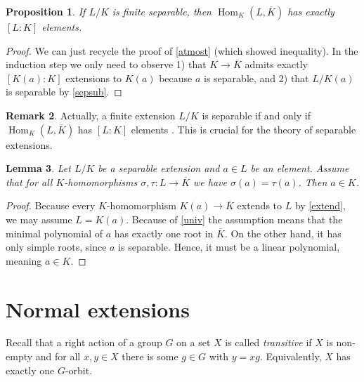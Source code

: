 \documentclass[11pt,reqno]{amsart}
\theoremstyle{standard}
\newtheorem{lemma}{Lemma}[section]
\newtheorem{prop}[lemma]{Proposition}
\theoremstyle{definition}
\newtheorem{rem}[lemma]{Remark}
\DeclareMathOperator{\Hom}{Hom}
\newcommand{\alg}[1]{\overline{#1}}
\begin{document}
\begin{prop} \label{counthom}
If $L/K$ is finite separable, then $\Hom_K(L,\alg{K})$ has exactly $[L:K]$ elements.
\end{prop}

\begin{proof}
We can just recycle the proof of \cref{atmost} (which showed inequality). In the induction step we only need to observe 1) that $K \to \alg{K}$ admits exactly $[K(a):K]$ extensions to $K(a)$ because $a$ is separable, and 2) that $L/K(a)$ is separable by \cref{sepsub}.
\end{proof}

\begin{rem}
Actually, a finite extension $L/K$ is separable if and only if $\Hom_K(L,\alg{K})$ has $[L:K]$ elements \cite[Lem.\ VII.4.24]{Aluffi}. This is crucial for the theory of separable extensions.
\end{rem}

\begin{lemma} \label{ground}
Let $L/K$ be a separable extension and $a \in L$ be an element. Assume that for all $K$-homomorphisms $\sigma,\tau : L \to \alg{K}$ we have $\sigma(a)=\tau(a)$. Then $a \in K$.
\end{lemma}

\begin{proof}
Because every $K$-homomorphism $K(a) \to \alg{K}$ extends to $L$ by \cref{extend}, we may assume $L = K(a)$. Because of \cref{univ} the assumption means that the minimal polynomial of $a$ has exactly one root in $\alg{K}$. On the other hand, it has only simple roots, since $a$ is separable. Hence, it must be a linear polynomial, meaning $a \in K$.
\end{proof}



\section{Normal extensions}

Recall that a right action of a group $G$ on a set $X$ is called \emph{transitive} if $X$ is non-empty and for all $x,y \in X$ there is some $g \in G$ with $y = xg$. Equivalently, $X$ has exactly one $G$-orbit.
\end{document}
